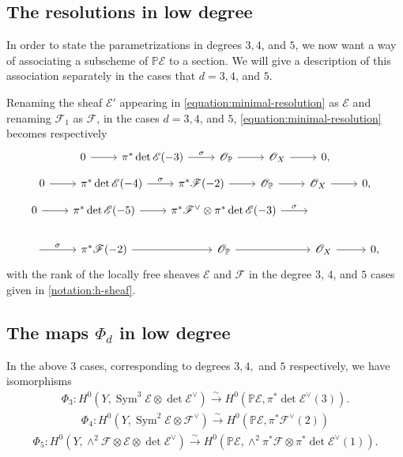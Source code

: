 \documentclass[12 pt]{amsart}
\theoremstyle{plain}
\theoremstyle{definition}
\theoremstyle{remark}
\numberwithin{equation}{section}
\newcommand\bp{\mathbb P}
\newcommand\sce{\mathscr E}
\newcommand\scf{\mathscr F}
\newcommand\sco{\mathscr O}
\DeclareMathOperator\sym{Sym}
\begin{document}
\subsection{The resolutions in low degree}

In order to state the parametrizations in degrees $3,4$, and $5$,
we now want a way of associating a subscheme of $\bp \sce$ to a section.
We will give a description of this association separately in the cases
that $d = 3,4$, and $5$.

Renaming the sheaf $\mathscr E'$ appearing in \eqref{equation:minimal-resolution}
as $\mathscr E$ and renaming $\mathscr F_1$ as $\mathscr F$,
in the cases $d =3,4$, and $5$,
\eqref{equation:minimal-resolution} becomes respectively
\begin{equation}
\label{equation:degree-3-resolution} \begin{tikzcd} 0 \ar {r} &  \pi^* \det
	\sce(-3) \ar {r}{\sigma} & \sco_{\bp} \ar {r} & \sco_X \ar {r} & 0,
\end{tikzcd}\end{equation}
\begin{equation}
\label{equation:degree-4-resolution} 
\begin{tikzcd} 0 \ar {r} &  \pi^* \det
\sce(-4) \ar {r}{\sigma} & \pi^*\scf(-2) \ar{r} &  \sco_{\bp} \ar {r} & \sco_X
\ar {r} & 0,  \end{tikzcd}\end{equation}
\begin{equation}
	\label{equation:degree-5-resolution} \begin{tikzcd} 0 \ar {r} & 
		\pi^* \det \sce(-5) \ar {r} & \pi^*\scf^\vee\otimes \pi^* \det
		\sce(-3) \ar{r}{\sigma} & \qquad\\
		\ar{r}{\sigma} & \pi^*\scf(-2) \ar{r} &  \sco_{\bp} \ar
		{r} & \sco_X \ar {r} & 0,
\end{tikzcd}\end{equation} 
with the rank of the locally free sheaves $\sce$ and $\scf$ in the degree $3$, $4$, and $5$
cases given in \autoref{notation:h-sheaf}.

\subsection{The maps $\Phi_d$ in low degree}



In the above $3$ cases, corresponding to degrees $3,4,$ and $5$ respectively, we
have isomorphisms
\begin{align}
	\label{equation:phi-3}
	\Phi_3: H^0(Y, \sym^3 \sce \otimes \det \sce^{\vee}) \overset
\sim \longrightarrow  H^0(\bp\sce, \pi^* \det \sce^{\vee}(3)).  \end{align}
\begin{align}
	\label{equation:phi-4}
	\Phi_4: H^0(Y, \sym^2 \sce \otimes \scf^\vee) \overset
  \sim \longrightarrow 
H^0(\bp\sce, \pi^* \scf^\vee(2))	\end{align} 
\begin{align}
	\label{equation:phi-5}
	\Phi_5: H^0(Y, \wedge^2 \scf \otimes \sce \otimes \det
\sce^{\vee}) \overset \sim \longrightarrow  H^0(\bp\sce, \wedge^2  \pi^* \scf \otimes \pi^* \det
\sce^{\vee}(1)).  \end{align}
\end{document}
